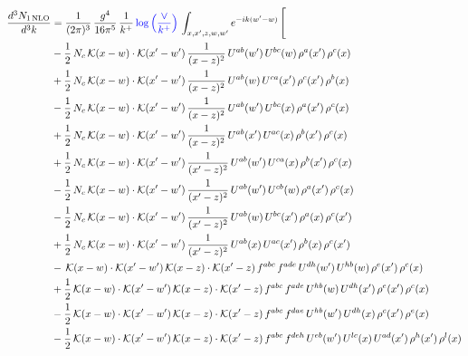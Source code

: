 \documentclass[10pt]{article}
\numberwithin{equation}{section}
\begin{document}
\begin{align}
\frac{d^{3}N_{1\,\mathrm{NLO}}}{d^{3}k} & = \frac{1}{(2\pi)^{3}}\,\frac{g^{4}}{16\pi^{5}}\,\frac{1}{k^{+}}\,{\color{blue}\log{\left(\frac{\vee}{k^{+}}\right)}}\,\int_{x,x',z,w,w'}e^{-ik(w'-w)}\,\Bigg[\notag\\ & -\frac{1}{2}\,N_{c}\,\mathcal{K}(x-w)\cdot\mathcal{K}(x'-w')\,\frac{1}{(x-z)^{2}}\,U^{ab}(w')\,U^{bc}(w)\,\rho^{a}(x')\,\rho^{c}(x)\notag\\
& +\frac{1}{2}\,N_{c}\,\mathcal{K}(x-w)\cdot\mathcal{K}(x'-w')\,\frac{1}{(x-z)^{2}}\,U^{ab}(w)\,U^{ca}(x')\,\rho^{c}(x')\,\rho^{b}(x)\notag\\
& -\frac{1}{2}\,N_{c}\,\mathcal{K}(x-w)\cdot\mathcal{K}(x'-w')\,\frac{1}{(x-z)^{2}}\,U^{ab}(w')\,U^{bc}(x)\,\rho^{a}(x')\,\rho^{c}(x)\notag\\
& +\frac{1}{2}\,N_{c}\,\mathcal{K}(x-w)\cdot\mathcal{K}(x'-w')\,\frac{1}{(x-z)^{2}}\,U^{ab}(x')\,U^{ac}(x)\,\rho^{b}(x')\,\rho^{c}(x)\notag\\
& +\frac{1}{2}\,N_{c}\,\mathcal{K}(x-w)\cdot\mathcal{K}(x'-w')\,\frac{1}{(x'-z)^{2}}\,U^{ab}(w')\,U^{ca}(x)\,\rho^{b}(x')\,\rho^{c}(x)\notag\\
& -\frac{1}{2}\,N_{c}\,\mathcal{K}(x-w)\cdot\mathcal{K}(x'-w')\,\frac{1}{(x'-z)^{2}}\,U^{ab}(w')\,U^{cb}(w)\,\rho^{a}(x')\,\rho^{c}(x)\notag\\
& -\frac{1}{2}\,N_{c}\,\mathcal{K}(x-w)\cdot\mathcal{K}(x'-w')\,\frac{1}{(x'-z)^{2}}\,U^{ab}(w)\,U^{bc}(x')\,\rho^{a}(x)\,\rho^{c}(x')\notag\\
& +\frac{1}{2}\,N_{c}\,\mathcal{K}(x-w)\cdot\mathcal{K}(x'-w')\,\frac{1}{(x'-z)^{2}}\,U^{ab}(x)\,U^{ac}(x')\,\rho^{b}(x)\,\rho^{c}(x')\notag\\
& -\,\mathcal{K}(x-w)\cdot\mathcal{K}(x'-w')\,\mathcal{K}(x-z)\cdot\mathcal{K}(x'-z)\,f^{abc}\,f^{ade}\,U^{dh}(w')\,U^{hb}(w)\,\rho^{e}(x')\,\rho^{c}(x)\notag\\
& +\frac{1}{2}\,\mathcal{K}(x-w)\cdot\mathcal{K}(x'-w')\,\mathcal{K}(x-z)\cdot\mathcal{K}(x'-z)\,f^{abc}\,f^{ade}\,U^{hb}(w)\,U^{dh}(x')\,\rho^{e}(x')\,\rho^{c}(x)\notag\\
& -\frac{1}{2}\,\mathcal{K}(x-w)\cdot\mathcal{K}(x'-w')\,\mathcal{K}(x-z)\cdot\mathcal{K}(x'-z)\,f^{abc}\,f^{dae}\,U^{hb}(w')\,U^{dh}(x)\,\rho^{c}(x')\,\rho^{e}(x)\notag\\
& -\frac{1}{2}\,\mathcal{K}(x-w)\cdot\mathcal{K}(x'-w')\,\mathcal{K}(x-z)\cdot\mathcal{K}(x'-z)\,f^{abc}\,f^{deh}\,U^{eb}(w')\,U^{lc}(x)\,U^{ad}(x')\,\rho^{h}(x')\,\rho^{l}(x)\notag\\

\end{align}
\end{document}

